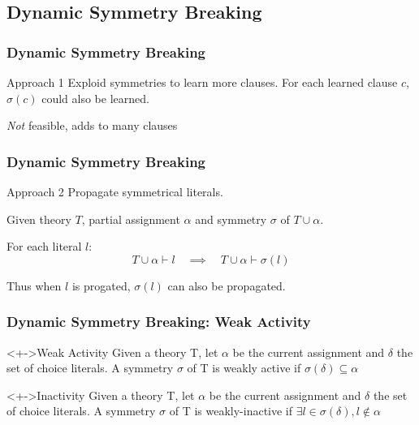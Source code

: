 \documentclass{beamer}
\begin{document}
	\subsection{Dynamic Symmetry Breaking}
	\begin{frame}
		\frametitle{Dynamic Symmetry Breaking}

		\begin{block}{Approach 1}
			Exploid symmetries to learn more clauses.
			For each learned clause $c$, $\sigma(c)$ could also be learned.

			\pause

			\emph{Not} feasible, adds to many clauses
		\end{block}
	\end{frame}

	\begin{frame}
		\frametitle{Dynamic Symmetry Breaking}

		\begin{block}{Approach 2}
			Propagate symmetrical literals.

			Given theory $T$, partial assignment $\alpha$ and symmetry
			\alert<2->{$\sigma$ of $T \cup \alpha$}.

			For each literal $l$:
			\begin{equation}
				T \cup \alpha \vdash l \quad
				\implies
				\quad T \cup \alpha \vdash \sigma(l)
			\end{equation}

			Thus when $l$ is progated, $\sigma(l)$ can also be propagated.
		\end{block}
	\end{frame}

	\begin{frame}
		\frametitle{Dynamic Symmetry Breaking: Weak Activity}

		\begin{block}<+->{Weak Activity}
			Given a theory T, let $\alpha$ be the current assignment and $\delta$ the set of
			choice literals.
			A symmetry $\sigma$ of T is weakly active if $\sigma(\delta) \subseteq \alpha$
		\end{block}

		\begin{block}<+->{Inactivity}
			Given a theory T, let $\alpha$ be the current assignment and $\delta$ the set of
			choice literals.
			A symmetry $\sigma$ of T is weakly-inactive if $\exists l \in \sigma(\delta), l \not\in \alpha$
		\end{block}
	\end{frame}
\end{document}

